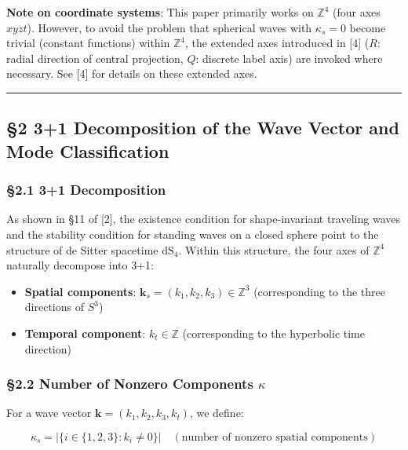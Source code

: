 \documentclass[
  a4paper,11pt]{article}
\providecommand{\tightlist}{%
  \setlength{\itemsep}{0pt}\setlength{\parskip}{0pt}}
\theoremstyle{definition}
\theoremstyle{remark}
\begin{document}
\textbf{Note on coordinate systems}: This paper primarily works on
\(\mathbb{Z}^4\) (four axes \(xyzt\)). However, to avoid the problem
that spherical waves with \(\kappa_s = 0\) become trivial (constant
functions) within \(\mathbb{Z}^4\), the extended axes introduced in
{[}4{]} (\(R\): radial direction of central projection, \(Q\): discrete
label axis) are invoked where necessary. See {[}4{]} for details on
these extended axes.

\begin{center}\rule{0.5\linewidth}{0.5pt}\end{center}

\subsection{§2 3+1 Decomposition of the Wave Vector and Mode
Classification}\label{decomposition-of-the-wave-vector-and-mode-classification}

\subsubsection{§2.1 3+1 Decomposition}\label{decomposition}

As shown in §11 of {[}2{]}, the existence condition for shape-invariant
traveling waves and the stability condition for standing waves on a
closed sphere point to the structure of de Sitter spacetime
\(\mathrm{dS}_4\). Within this structure, the four axes of
\(\mathbb{Z}^4\) naturally decompose into 3+1:

\begin{itemize}
\tightlist
\item
  \textbf{Spatial components}:
  \(\mathbf{k}_s = (k_1, k_2, k_3) \in \mathbb{Z}^3\) (corresponding to
  the three directions of \(S^3\))
\item
  \textbf{Temporal component}: \(k_t \in \mathbb{Z}\) (corresponding to
  the hyperbolic time direction)
\end{itemize}

\subsubsection{\texorpdfstring{§2.2 Number of Nonzero Components
\(\kappa\)}{§2.2 Number of Nonzero Components \textbackslash kappa}}\label{number-of-nonzero-components-kappa}

For a wave vector \(\mathbf{k} = (k_1, k_2, k_3, k_t)\), we define:

\[\kappa_s = |\{i \in \{1, 2, 3\} : k_i \neq 0\}| \quad (\text{number of nonzero spatial components})\]
\end{document}
